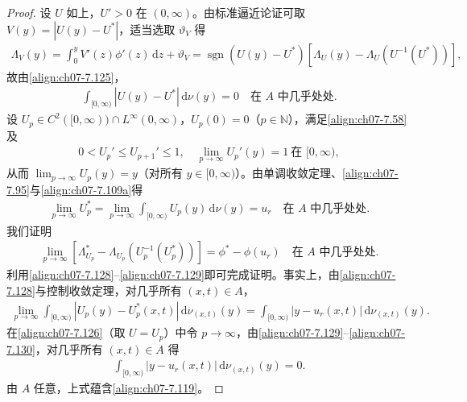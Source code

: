 \documentclass[../../main.tex]{subfiles}%
\begin{document}
\begin{proof}
设 $U$ 如上，$U'>0$ 在 $(0,\infty)$。由标准逼近论证可取 $V(y)=|U(y)-U^*|$，适当选取 $\vartheta_V$ 得
\begin{align*}
\Lambda_V(y)=\int_0^y V'(z)\phi'(z)\,\mathrm{d}z+\vartheta_V
=\operatorname{sgn}(U(y)-U^*)[\Lambda_U(y)-\Lambda_U(U^{-1}(U^*))],
\end{align*}
故由\eqref{align:ch07-7.125}，
\begin{align}
[\Lambda_U^*-\Lambda_U(U^{-1}(U^*))]\int_{[0,\infty)}|U(y)-U^*|\,\mathrm{d}\nu(y)=0
\quad\text{在 }A\text{ 中几乎处处}. \label{align:ch07-7.126}
\end{align}
设 $U_p\in C^2([0,\infty))\cap L^\infty(0,\infty)$，$U_p(0)=0$（$p\in\mathbb{N}$），满足\eqref{align:ch07-7.58}及
\begin{align}
0<U_p'\leqslant U_{p+1}'\leqslant1,\quad \lim_{p\to\infty}U_p'(y)=1\ \text{在 }[0,\infty), \label{align:ch07-7.127}
\end{align}
从而 $\lim_{p\to\infty}U_p(y)=y$（对所有 $y\in[0,\infty)$）。由单调收敛定理、\eqref{align:ch07-7.95}与\eqref{align:ch07-7.109a}得
\begin{align}
\lim_{p\to\infty}U_p^*=\lim_{p\to\infty}\int_{[0,\infty)}U_p(y)\,\mathrm{d}\nu(y)=u_r\quad\text{在 }A\text{ 中几乎处处}. \label{align:ch07-7.128}
\end{align}
我们证明
\begin{align}
\lim_{p\to\infty}[\Lambda_{U_p}^*-\Lambda_{U_p}(U_p^{-1}(U_p^*))]=\phi^*-\phi(u_r)\quad\text{在 }A\text{ 中几乎处处}. \label{align:ch07-7.129}
\end{align}
利用\eqref{align:ch07-7.128}--\eqref{align:ch07-7.129}即可完成证明。事实上，由\eqref{align:ch07-7.128}与控制收敛定理，对几乎所有 $(x,t)\in A$，
\begin{align}
\lim_{p\to\infty}\int_{[0,\infty)}|U_p(y)-U_p^*(x,t)|\,\mathrm{d}\nu_{(x,t)}(y)
=\int_{[0,\infty)}|y-u_r(x,t)|\,\mathrm{d}\nu_{(x,t)}(y). \label{align:ch07-7.130}
\end{align}
在\eqref{align:ch07-7.126}（取 $U=U_p$）中令 $p\to\infty$，由\eqref{align:ch07-7.129}--\eqref{align:ch07-7.130}，对几乎所有 $(x,t)\in A$ 得
\begin{align*}
[\phi^*(x,t)-\phi(u_r)(x,t)]\int_{[0,\infty)}|y-u_r(x,t)|\,\mathrm{d}\nu_{(x,t)}(y)=0.
\end{align*}
由 $A$ 任意，上式蕴含\eqref{align:ch07-7.119}。


\end{proof}
\end{document}
